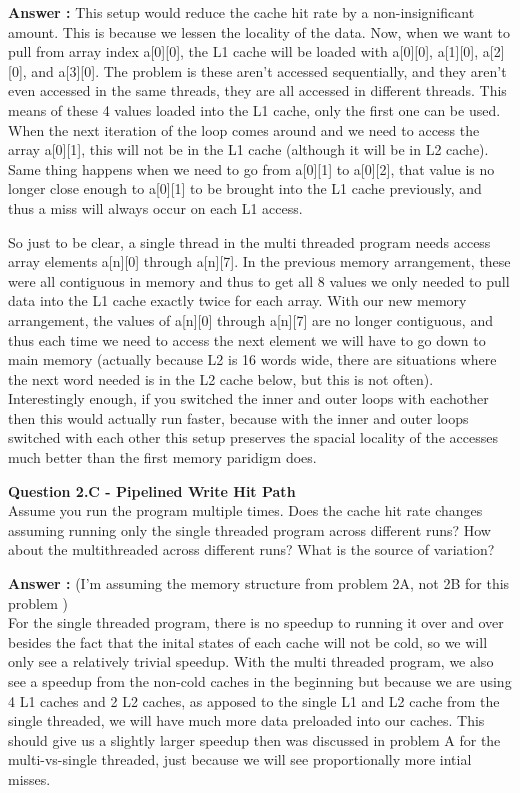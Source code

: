 \documentclass[a4paper,11pt]{article}
\newcommand{\answer}{\textbf{Answer : }}
\begin{document}
\answer This setup would reduce the cache hit rate by a non-insignificant amount. This is because we lessen the locality of the data. Now, when we want to pull from array index a[0][0], the L1 cache will be loaded with a[0][0], a[1][0], a[2][0], and a[3][0]. The problem is these aren't accessed sequentially, and they aren't even accessed in the same threads, they are all accessed in different threads. This means of these 4 values loaded into the L1 cache, only the first one can be used. When the next iteration of the loop comes around and we need to access the array a[0][1], this will not be in the L1 cache (although it will be in L2 cache). Same thing happens when we need to go from a[0][1] to a[0][2], that value is no longer close enough to a[0][1] to be brought into the L1 cache previously, and thus a miss will always occur on each L1 access. 

So just to be clear, a single thread in the multi threaded program needs access array elements a[n][0] through a[n][7]. In the previous memory arrangement, these were all contiguous in memory and thus to get all 8 values we only needed to pull data into the L1 cache exactly twice for each array. With our new memory arrangement, the values of a[n][0] through a[n][7] are no longer contiguous, and thus each time we need to access the next element we will have to go down to main memory (actually because L2 is 16 words wide, there are situations where the next word needed is in the L2 cache below, but this is not often). \\

Interestingly enough, if you switched the inner and outer loops with eachother then this would actually run faster, because with the inner and outer loops switched with each other this setup preserves the spacial locality of the accesses much better than the first memory paridigm does. 


  
\item \textbf{Question 2.C - Pipelined Write Hit Path} \\

Assume you run the program multiple times. Does the cache hit rate changes assuming running only the single threaded program across different runs? How about the multithreaded across different runs? What is the source of variation?

\answer (I'm assuming the memory structure from problem 2A, not 2B for this problem ) \\
For the single threaded program, there is no speedup to running it over and over besides the fact that the inital states of each cache will not be cold, so we will only see a relatively trivial speedup. With the multi threaded program, we also see a speedup from the non-cold caches in the beginning but because we are using 4 L1 caches and 2 L2 caches, as apposed to the single L1 and L2 cache from the single threaded, we will have much more data preloaded into our caches. This should give us a slightly larger speedup then was discussed in problem A for the multi-vs-single threaded, just because we will see proportionally more intial misses.
\end{document}
